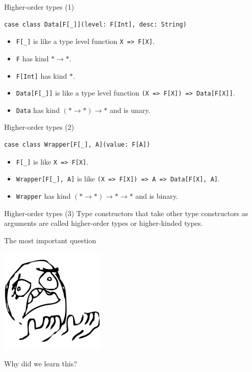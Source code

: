\documentclass[presentation,aspectratio=169,smaller]{beamer}
\begin{document}
\begin{frame}[label={sec:org808b879},fragile]{Higher-order types (1)}
 \begin{verbatim}
case class Data[F[_]](level: F[Int], desc: String)
\end{verbatim}

\begin{itemize}
\item <2-> \texttt{F[\_]} is like a type level function \texttt{X => F[X]}.
\item <3-> \texttt{F} has kind \(* \rightarrow *\).
\item <4-> \texttt{F[Int]} has kind \(*\).
\item <5-> \texttt{Data[F[\_]]} is like a type level function \texttt{(X => F[X]) => Data[F[X]]}.
\item <6-> \texttt{Data} has kind \((* \rightarrow *) \rightarrow *\) and is unary.
\end{itemize}
\end{frame}

\begin{frame}[label={sec:org69cda78},fragile]{Higher-order types (2)}
 \begin{verbatim}
case class Wrapper[F[_], A](value: F[A])
\end{verbatim}

\begin{itemize}
\item <2-> \texttt{F[\_]} is like \texttt{X => F[X]}.
\item <3-> \texttt{Wrapper[F[\_], A]} is like \texttt{(X => F[X]) => A => Data[F[X], A]}.
\item <4-> \texttt{Wrapper} has kind \((* \rightarrow *) \rightarrow * \rightarrow *\) and is binary.
\end{itemize}
\end{frame}

\begin{frame}[label={sec:org60b695b}]{Higher-order types (3)}
Type constructors that take other type constructors as arguments are called
\alert{higher-order types} or \alert{higher-kinded types}.
\end{frame}

\begin{frame}[label={sec:org7b78b5a}]{The most important question}
\begin{center}
\includegraphics[height=5cm]{images/whyyy.png}
\end{center}

Why did we learn this?
\end{frame}
\end{document}

